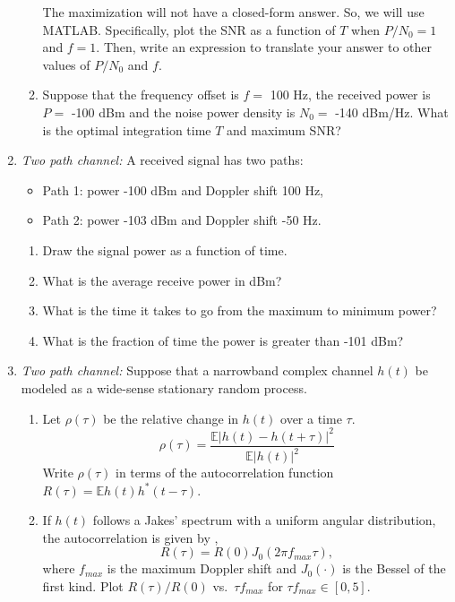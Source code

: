 \documentclass[11pt]{article}
\def\Exp{\mathbb{E}}
\begin{document}
\begin{enumerate}
\begin{enumerate}[label=(\alph*)]
The maximization will not have a closed-form answer.  So, we will use MATLAB.
Specifically, plot the SNR as a function of $T$ when $P/N_0=1$ and $f=1$.  Then,
write an expression to translate your answer to other values of $P/N_0$ and $f$.

\item Suppose that the frequency offset is $f=$ 100 Hz, the received power
is $P=$ -100 dBm and the noise power density is $N_0=$ -140 dBm/Hz.
What is the optimal integration time $T$ and maximum SNR?

\end{enumerate}

\item \emph{Two path channel:}  A received signal has two paths:
\begin{itemize}
\item Path 1:  power -100 dBm and Doppler shift 100 Hz,
\item Path 2:  power -103 dBm and Doppler shift -50 Hz.
\end{itemize}
\begin{enumerate}[label=(\alph*)]
\item Draw the signal power as a function of time.
\item What is the average receive power in dBm?
\item What is the time it takes to go from the maximum to minimum power?
\item What is the fraction of time the power is greater than -101 dBm?
\end{enumerate}

\item \emph{Two path channel:}   Suppose that a narrowband complex channel $h(t)$ be modeled as
a wide-sense stationary random process.
\begin{enumerate}[label=(\alph*)]

\item Let $\rho(\tau)$ be the relative change
in $h(t)$ over a time $\tau$.
\[
    \rho(\tau) = \frac{\Exp|h(t)-h(t+\tau)|^2}{\Exp|h(t)|^2}
\]
Write $\rho(\tau)$ in terms of the autocorrelation function
$R(\tau) = \Exp h(t)h^*(t-\tau)$.

\item If $h(t)$ follows a Jakes' spectrum with a uniform angular distribution,
the autocorrelation is given by ,
\[
    R(\tau) = R(0)J_0(2\pi f_{max}\tau),
\]
where $f_{max}$ is the maximum Doppler shift and $J_0(\cdot)$ is the Bessel 
of the first kind.  Plot $R(\tau)/R(0)$ vs.\ $\tau f_{max}$ for $\tau f_{max} \in [0,5]$.


\end{enumerate}
\end{enumerate}
\end{document}
